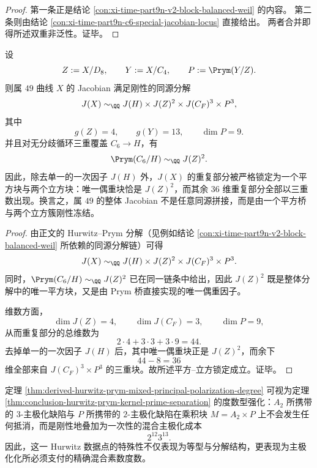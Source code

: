 \begin{proof}
第一条正是结论 \ref{con:xi-time-part9n-v2-block-balanced-weil} 的内容。
第二条则由结论 \ref{con:xi-time-part9n-c6-special-jacobian-locus} 直接给出。
两者合并即得所述双重非泛性。证毕。
\end{proof}

\begin{theorem}\label{thm:derived-hurwitz-genus49-square-cube-locking}
设
\[
Z:=X/D_8,
\qquad
Y:=X/C_4,
\qquad
P:=\Prym(Y/Z).
\]
则属 \(49\) 曲线 \(X\) 的 Jacobian 满足刚性的同源分解
\[
J(X)\sim_{\QQ}J(H)\times J(Z)^2\times J(C_F)^3\times P^3,
\]
其中
\[
g(Z)=4,
\qquad
g(Y)=13,
\qquad
\dim P=9.
\]
并且对无分歧循环三重覆盖 \(C_6\to H\)，有
\[
\Prym(C_6/H)\sim_{\QQ}J(Z)^2.
\]
因此，除去单一的一次因子 \(J(H)\) 外，\(J(X)\) 的重复部分被严格锁定为一个平方块与两个立方块：唯一偶重块恰是 \(J(Z)^2\)，而其余 \(36\) 维重复部分全部以三重数出现。换言之，属 \(49\) 的整体 Jacobian 不是任意同源拼接，而是由一个平方桥与两个立方簇刚性冻结。
\end{theorem}

\begin{proof}
由正文的 Hurwitz--Prym 分解（见例如结论 \ref{con:xi-time-part9n-v2-block-balanced-weil} 所依赖的同源分解链）可得
\[
J(X)\sim_{\QQ}J(H)\times J(Z)^2\times J(C_F)^3\times P^3.
\]
同时，\(\Prym(C_6/H)\sim_{\QQ}J(Z)^2\) 已在同一链条中给出，因此 \(J(Z)^2\) 既是整体分解中的唯一平方块，又是由 Prym 桥直接实现的唯一偶重因子。

维数方面，
\[
\dim J(Z)=4,\qquad \dim J(C_F)=3,\qquad \dim P=9,
\]
从而重复部分的总维数为
\[
2\cdot 4+3\cdot 3+3\cdot 9=44.
\]
去掉单一的一次因子 \(J(H)\) 后，其中唯一偶重块正是 \(J(Z)^2\)，而余下
\[
44-8=36
\]
维全部来自 \(J(C_F)^3\times P^3\) 的三重块。故所述平方--立方锁定成立。证毕。
\end{proof}

\begin{remark}[互素极化缺陷不会在乘积块上相互抵消]\label{rem:derived-hurwitz-mixed-prym-defects-do-not-cancel}
定理 \ref{thm:derived-hurwitz-prym-mixed-principal-polarization-degree}
可视为定理 \ref{thm:conclusion-hurwitz-prym-kernel-prime-separation}
的度数型强化：\(A_2\) 所携带的 \(3\)-主极化缺陷与 \(P\) 所携带的 \(2\)-主极化缺陷在乘积块 \(M=A_2\times P\) 上不会发生任何抵消，而是刚性地叠加为一次性的混合主极化成本
\[
2^{12}3^{13}.
\]
因此，这一 Hurwitz 数据点的特殊性不仅表现为等型与分解结构，更表现为主极化化所必须支付的精确混合素数度数。
\end{remark}


